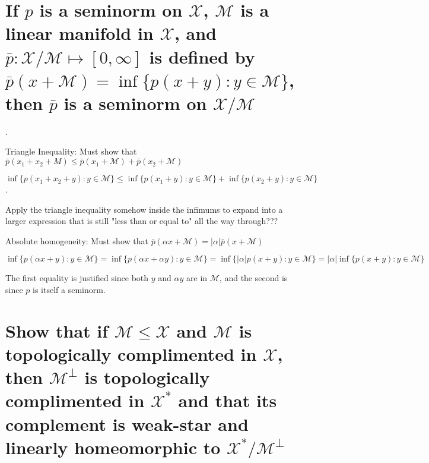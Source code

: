 \documentclass{article}
\begin{document}
\section{If $p$ is a seminorm on $\mathscr{X}$, $\mathscr{M}$ is a linear manifold in $\mathscr{X}$, and $\bar{p}: \mathscr{X} / \mathscr{M} \mapsto [0,\infty]$ is defined by $\bar{p}(x + \mathscr{M}) = \inf\{p(x+y):y \in \mathscr{M}\}$, then $\bar{p}$ is a seminorm on $\mathscr{X} / \mathscr{M}$}.

Triangle Inequality: Must show that $\bar{p}(x_1+x_2+M) \le \bar{p}(x_1+\mathscr{M}) + \bar{p}(x_2+\mathscr{M})$

$\inf\{p(x_1 + x_2 + y) : y \in \mathscr{M}\} \le \inf\{p(x_1 + y) : y \in \mathscr{M}\} + \inf\{p(x_2 + y ): y \in \mathscr{M}\}$.

Apply the triangle inequality somehow inside the infimums to expand into a larger expression that is still "less than or equal to" all the way through???

Absolute homogeneity: Must show that $\bar{p}(\alpha x + \mathscr{M}) = |\alpha|\bar{p}(x + \mathscr{M})$

$\inf\{p( \alpha x +y) : y \in \mathscr{M}\} = \inf\{p( \alpha x + \alpha y) : y \in \mathscr{M}\} = \inf\{  | \alpha | p( x +y) : y \in \mathscr{M}\}  =  | \alpha | \inf\{p( x +y) : y \in \mathscr{M}\} $

The first equality is justified since both $y$ and $\alpha y$ are in $\mathscr{M}$, and the second is since $p$ is itself a seminorm.

\section{Show that if $\mathscr{M} \le \mathscr{X}$ and $\mathscr{M}$ is topologically complimented in $\mathscr{X}$, then $\mathscr{M}^{\bot}$ is topologically complimented in $\mathscr{X}^*$ and that its complement is weak-star and linearly homeomorphic to $\mathscr{X}^* / \mathscr{M}^{\bot}$}
\end{document}
